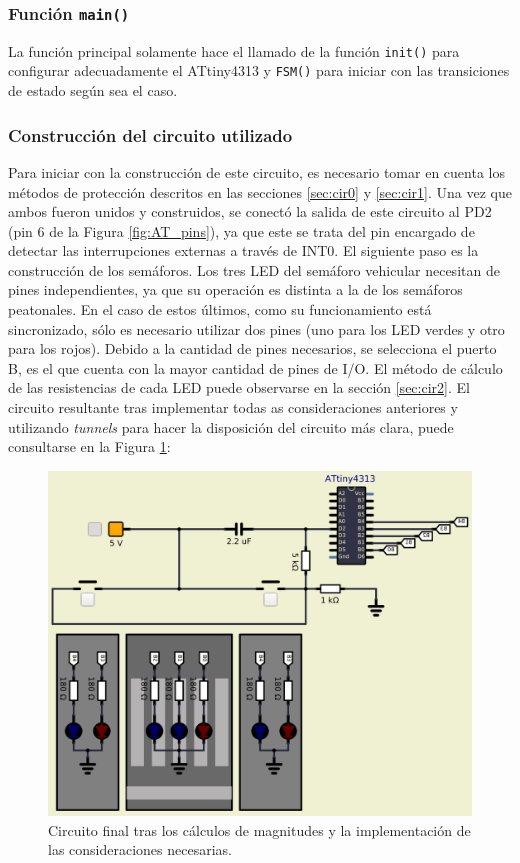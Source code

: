 \subsubsection{Función \texttt{main()}}
La función principal solamente hace el llamado de la función \texttt{init()} para configurar adecuadamente el ATtiny4313 y \texttt{FSM()} para iniciar con las transiciones de estado según sea el caso.  

\subsubsection{Construcción del circuito utilizado}
Para iniciar con la construcción de este circuito, es necesario tomar en cuenta los métodos de protección descritos en las secciones \ref{sec:cir0} y \ref{sec:cir1}. Una vez que ambos fueron unidos y construidos, se conectó la salida de este circuito al PD2 (pin 6 de la Figura \ref{fig:AT_pins}), ya que este se trata del pin encargado de detectar las interrupciones externas a través de INT0. El siguiente paso es la construcción de los semáforos. Los tres LED del semáforo vehicular necesitan de pines independientes, ya que su operación es distinta a la de los semáforos peatonales. En el caso de estos últimos, como su funcionamiento está sincronizado, sólo es necesario utilizar dos pines (uno para los LED verdes y otro para los rojos). Debido a la cantidad de pines necesarios, se selecciona el puerto B, es el que cuenta con la mayor cantidad de pines de I/O. El método de cálculo de las resistencias de cada LED puede observarse en la sección \ref{sec:cir2}. El circuito resultante tras implementar todas as consideraciones anteriores y utilizando \textit{tunnels} para hacer la disposición del circuito más clara, puede consultarse en la Figura \ref{fig:final}:

\begin{figure}[H]
\centering
\includegraphics[width=125mm]{./Figuras/Desarrollo_Analisis/final}
\caption{Circuito final tras los cálculos de magnitudes y la implementación de las consideraciones necesarias.} 
\label{fig:final}
\end{figure}

